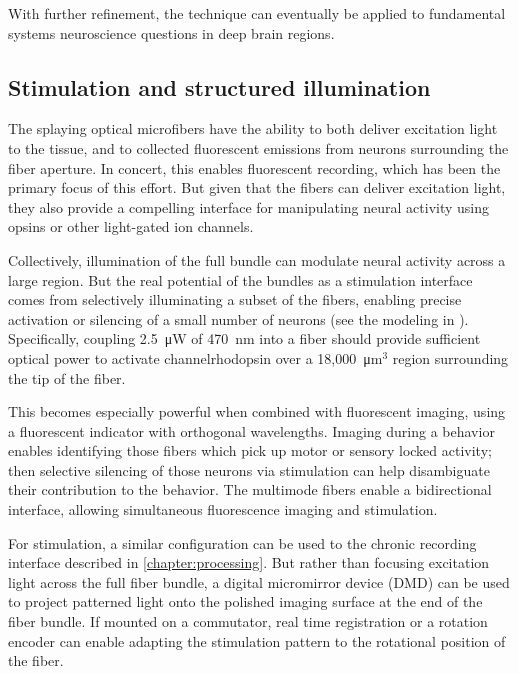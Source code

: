 With further refinement, the technique can eventually 
be applied to fundamental systems neuroscience 
questions in deep brain regions.

\subsection{Stimulation and structured illumination}

The splaying optical microfibers have the ability to 
both deliver excitation light to the tissue, and to 
collected fluorescent emissions from neurons 
surrounding the fiber aperture. In concert, this 
enables fluorescent recording, which has been the 
primary focus of this effort. But given that the 
fibers can deliver excitation light, they also 
provide a compelling interface for manipulating 
neural activity using opsins or other light-gated 
ion channels. 

Collectively, illumination of the full bundle can 
modulate neural activity across a large region. But 
the real potential of the bundles as a stimulation 
interface comes from selectively illuminating a 
subset of the fibers, enabling precise activation 
or silencing of a small number of neurons (see 
the modeling in ). 
Specifically, coupling 2.5~\si{\micro\watt} of 
470~nm into a fiber should provide sufficient 
optical power to activate channelrhodopsin over a 
18,000~\si{\micro\meter}$^3$ region surrounding 
the tip of the fiber.

This becomes especially powerful when combined 
with fluorescent imaging, using a fluorescent 
indicator with orthogonal wavelengths. Imaging 
during a behavior enables identifying those 
fibers which pick up motor or sensory locked 
activity; then selective silencing of those 
neurons via stimulation can help disambiguate 
their contribution to the behavior. The 
multimode fibers enable a bidirectional 
interface, allowing simultaneous fluorescence 
imaging and stimulation.

For stimulation, a similar configuration can be 
used to the chronic recording interface described 
in \cref{chapter:processing}. But rather than 
focusing excitation light across the full fiber  
bundle, a digital micromirror device (DMD) can be 
used to project patterned light onto the polished 
imaging surface at the end of the fiber bundle. 
If mounted on a commutator, real time registration 
or a rotation encoder can enable adapting the 
stimulation pattern to the rotational position of 
the fiber.

